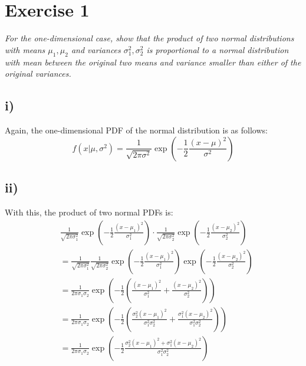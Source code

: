\documentclass[11pt]{scrartcl} %
\begin{document}
\section*{\\[3mm]Exercise 1}
         {\it For the one-dimensional case, show that the product of two normal distributions with means \(\mu_1, \mu_2\) and variances \(\sigma_1^2, \sigma_2^2\) is proportional to a normal distribution with mean between the original two means and variance smaller than either of the original variances.}
  

         \subsection*{i)}
         Again, the one-dimensional PDF of the normal distribution is as follows:
         \begin{equation}\label{eq:1}
           f(x|\mu,\sigma^2) =\frac{1}{\sqrt{2\pi\sigma^2}} %
           \exp\left(-\frac{1}{2}\frac{(x-\mu)^2}{\sigma^2} \right)
         \end{equation}

         \subsection*{ii)}
         With this, the product of two normal PDFs is:
         \begin{equation}\label{eq:2}
           \begin{split}
             &\frac{1}{\sqrt{2\pi\sigma_1^2}} 
           \exp\left(-\frac{1}{2}\frac{(x-\mu_1)^2}{\sigma_1^2} \right) \cdot \frac{1}{\sqrt{2\pi\sigma_2^2}} 
           \exp\left(-\frac{1}{2}\frac{(x-\mu_2)^2}{\sigma_2^2} \right)\\
           &= \frac{1}{\sqrt{2\pi\sigma_1^2}} \frac{1}{\sqrt{2\pi\sigma_2^2}}
           \exp\left(-\frac{1}{2}\frac{(x-\mu_1)^2}{\sigma_1^2} \right)  
           \exp\left(-\frac{1}{2}\frac{(x-\mu_2)^2}{\sigma_2^2} \right)\\
           &= \frac{1}{2\pi\sigma_1\sigma_2}
           \exp\left(-\frac{1}{2}\left(\frac{(x-\mu_1)^2}{\sigma_1^2}+\frac{(x-\mu_2)^2}{\sigma_2^2} \right)\right)\\
           &= \frac{1}{2\pi\sigma_1\sigma_2}
           \exp\left(-\frac{1}{2}\left(\frac{\sigma_2^2(x-\mu_1)^2}{\sigma_1^2\sigma_2^2}+\frac{\sigma_1^2(x-\mu_2)^2}{\sigma_1^2\sigma_2^2} \right)\right)\\
           &= \frac{1}{2\pi\sigma_1\sigma_2}
           \exp \left(-\frac{1}{2}\frac{\sigma_2^2(x-\mu_1)^2+\sigma_1^2(x-\mu_2)^2}{\sigma_1^2\sigma_2^2} \right)\\
           \end{split}
         \end{equation}
\end{document}
